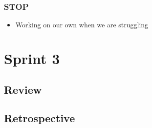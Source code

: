 \documentclass[]{report}
\begin{document}
			\subsection*{STOP}
				\begin{itemize}
					\item Working on our own when we are struggling
				\end{itemize}
	\chapter*{Sprint 3}
		\section*{Review}
		\section*{Retrospective}
\end{document}
